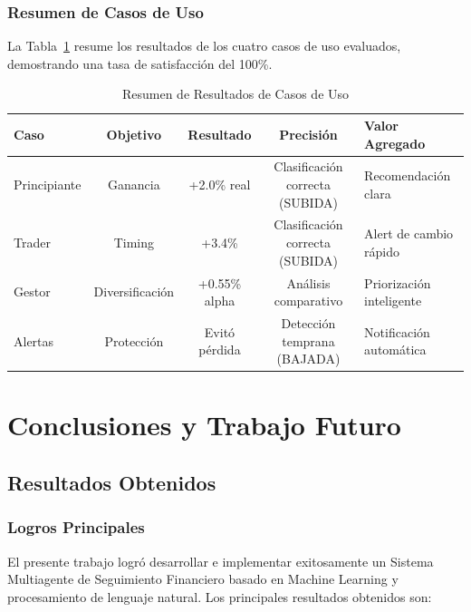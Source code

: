 \subsection{Resumen de Casos de Uso}

La Tabla~\ref{tab:casos_uso} resume los resultados de los cuatro casos de uso evaluados, demostrando una tasa de satisfacción del 100\%.

\begin{table}[htbp]
\centering
\caption{Resumen de Resultados de Casos de Uso}
\label{tab:casos_uso}
\small
\begin{tabular}{lcccp{4cm}}
\hline
\textbf{Caso} & \textbf{Objetivo} & \textbf{Resultado} & \textbf{Precisión} & \textbf{Valor Agregado} \\
\hline
Principiante & Ganancia & +2.0\% real & Clasificación correcta (SUBIDA) & Recomendación clara \\
Trader & Timing & +3.4\% & Clasificación correcta (SUBIDA) & Alert de cambio rápido \\
Gestor & Diversificación & +0.55\% alpha & Análisis comparativo & Priorización inteligente \\
Alertas & Protección & Evitó pérdida & Detección temprana (BAJADA) & Notificación automática \\
\hline
\end{tabular}
\end{table}

\chapter{Conclusiones y Trabajo Futuro}

\section{Resultados Obtenidos}

\subsection{Logros Principales}

El presente trabajo logró desarrollar e implementar exitosamente un Sistema Multiagente de Seguimiento Financiero basado en Machine Learning y procesamiento de lenguaje natural. Los principales resultados obtenidos son:

